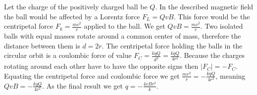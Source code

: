 {\ifEngSolution
Let the charge of the positively charged ball be $Q$. In the described magnetic field the ball would be affected by a Lorentz force $F_L=QvB$. This force would be the centripetal force $F_k=\frac{mv^2}{r}$ applied to the ball. We get $QvB=\frac{mv^2}{r}$. Two isolated balls with equal masses rotate around a common center of mass, therefore the distance between them is $d=2r$. The centripetal force holding the balls in the circular orbit is a coulombic force of value $F_C=\frac{kqQ}{d^2}=\frac{kqQ}{4r^2}$. Because the charges rotating around each other have to have the opposite signs then $|F_C|=-F_C$. Equating the centripetal force and coulombic force we get $\frac{mv^2}{r}=-\frac{kqQ}{4r^2}$, meaning $QvB=-\frac{kqQ}{4r^2}$. As the final result we get $q=-\frac{4vBr^2}{k}$.
\fi
}